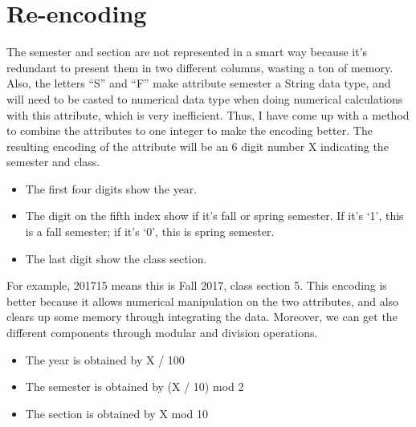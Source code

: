\documentclass{article}
\begin{document}
\section{Re-encoding}
\justifying
The semester and section are not represented in a smart way because it’s redundant to present them in two different columns, wasting a ton of memory. Also, the letters “S” and “F” make attribute semester a String data type, and will need to be casted to numerical data type when doing numerical calculations with this attribute, which is very inefficient. Thus, I have come up with a method to combine the attributes to one integer to make the encoding better.
The resulting encoding of the attribute will be an 6 digit number X indicating the semester and class.
\begin{itemize}
    \item The first four digits show the year.
    \item The digit on the fifth index show if it’s fall or spring semester. If it’s ‘1’, this is a fall semester; if it’s ‘0’, this is spring semester.
    \item The last digit show the class section.
\end{itemize}
For example, 201715 means this is Fall 2017, class section 5.
This encoding is better because it allows numerical manipulation on the two attributes, and also clears up some memory through integrating the data. Moreover, we can get the different components through modular and division operations.
\begin{itemize}
    \item The year is obtained by X / 100
    \item The semester is obtained by (X / 10) mod 2
    \item The section is obtained by X mod 10
\end{itemize}
\end{document}
